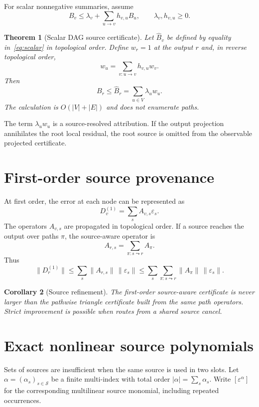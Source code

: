 \documentclass[11pt]{amsart}
\newtheorem{theorem}{Theorem}[section]
\newtheorem{corollary}[theorem]{Corollary}
\theoremstyle{definition}
\theoremstyle{remark}
\newcommand{\norm}[1]{\lVert#1\rVert}
\begin{document}
For scalar nonnegative summaries, assume
\begin{equation}
 B_v\le\lambda_v+\sum_{u\to v}h_{v,u}B_u,
 \qquad \lambda_v,h_{v,u}\ge0.
 \label{eq:scalar}
\end{equation}

\begin{theorem}[Scalar DAG source certificate]
\label{thm:scalar}
Let $\widehat B_v$ be defined by equality in~\eqref{eq:scalar} in topological
order. Define $w_r=1$ at the output $r$ and, in reverse topological order,
\[
 w_u=\sum_{v:u\to v}h_{v,u}w_v.
\]
Then
\[
 B_r\le\widehat B_r=\sum_{u\in V}\lambda_u w_u.
\]
The calculation is $O(|V|+|E|)$ and does not enumerate paths.
\end{theorem}

The term $\lambda_u w_u$ is a source-resolved attribution. If the output
projection annihilates the root local residual, the root source is omitted
from the observable projected certificate.

\section{First-order source provenance}

At first order, the error at each node can be represented as
\begin{equation}
 D_v^{(1)}=\sum_s A_{v,s}\varepsilon_s.
 \label{eq:first-order}
\end{equation}
The operators $A_{v,s}$ are propagated in topological order. If a source
reaches the output over paths $\pi$, the source-aware operator is
\[
 A_{r,s}=\sum_{\pi:s\leadsto r}A_\pi.
\]
Thus
\[
 \norm{D_r^{(1)}}\le\sum_s\norm{A_{r,s}}\,\norm{\varepsilon_s}
 \le\sum_s\sum_{\pi:s\leadsto r}\norm{A_\pi}\,\norm{\varepsilon_s}.
\]

\begin{corollary}[Source refinement]
The first-order source-aware certificate is never larger than the pathwise
triangle certificate built from the same path operators. Strict improvement is
possible when routes from a shared source cancel.
\end{corollary}

\section{Exact nonlinear source polynomials}

Sets of sources are insufficient when the same source is used in two slots.
Let $\alpha=(\alpha_s)_{s\in\mathcal S}$ be a finite multi-index with total
order $|\alpha|=\sum_s\alpha_s$. Write $[\varepsilon^\alpha]$ for the
corresponding multilinear source monomial, including repeated occurrences.
\end{document}
